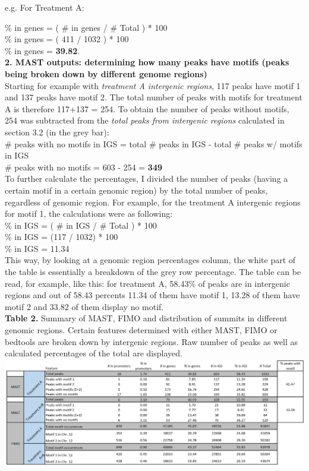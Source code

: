\documentclass[a4paper,11pt]{article}
\begin{document}
e.g. For Treatment A:

\noindent \% in genes = ( \# in genes / \# Total ) * 100\\
\% in genes = ( 411 / 1032 ) * 100\\
\% in genes = \textbf{39.82}.\\

\noindent \textbf{2. MAST outputs: determining how many peaks have motifs (peaks being broken down by different genome regions)}\\

\noindent Starting for example with \textit{treatment A intergenic regions}, 117 peaks have motif 1 and 137 peaks have motif 2. The total number of peaks with motifs for treatment A is therefore 117+137 = 254. To obtain the number of peaks without motifs, 254 was subtracted from the \textit{total peaks from intergenic regions} calculated in section 3.2 (in the grey bar):\\

\noindent \# peaks with no motifs in IGS = total \# peaks in IGS - total \# peaks w/ motifs in IGS\\
\# peaks with no motifs = 603 - 254 = \textbf{349}\\

\noindent To further calculate the percentages, I divided the number of peaks (having a certain motif in a certain genomic region) by the total number of peaks, regardless of genomic region. For example, for the treatment A intergenic regions for motif 1, the calculations were as following:\\

\noindent \% in IGS = ( \# in IGS / \# Total ) * 100\\
\% in IGS = (117 / 1032) * 100\\
\% in IGS = 11.34\\

\noindent This way, by looking at a genomic region percentages column, the white part of the table is essentially a breakdown of the grey row percentage. The table can be read, for example, like this: for treatment A, 58.43\% of peaks are in intergenic regions and out of 58.43 percents 11.34 of them have motif 1, 13.28 of them have motif 2 and 33.82 of them display no motif.\\


\noindent \footnotesize \textbf{Table 2.} Summary of MAST, FIMO and distribution of summits in different genomic regions. Certain features determined with either MAST, FIMO or bedtools are broken down by intergenic regions. Raw number of peaks as well as calculated percentages of the total are displayed. 
\flushleft \noindent \includegraphics[scale=0.55]{Table2.PNG}
\end{document}
